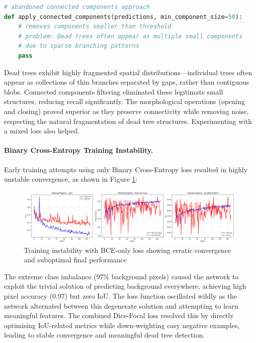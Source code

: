 \begin{lstlisting}[language=Python]
# abandoned connected components approach
def apply_connected_components(predictions, min_component_size=50):
    # removes components smaller than threshold
    # problem: Dead trees often appear as multiple small components
    # due to sparse branching patterns
    pass
\end{lstlisting}

Dead trees exhibit highly fragmented spatial distributions—individual trees often appear as collections of thin branches separated by gaps, rather than contiguous blobs. Connected components filtering eliminated these legitimate small structures, reducing recall significantly. The morphological operations (opening and closing) proved superior as they preserve connectivity while removing noise, respecting the natural fragmentation of dead tree structures. Experimenting with a mixed loss also helped.

\paragraph{Binary Cross-Entropy Training Instability.}
Early training attempts using only Binary Cross-Entropy loss resulted in highly unstable convergence, as shown in Figure \ref{fig:bad_training}:

\begin{figure}[h]
  \centering
  \includegraphics[width=0.9\linewidth]{figs/unet-bad-train.jpg}
  \caption{Training instability with BCE-only loss showing erratic convergence and suboptimal final performance}
  \label{fig:bad_training}
\end{figure}

The extreme class imbalance (97\% background pixels) caused the network to exploit the trivial solution of predicting background everywhere, achieving high pixel accuracy (0.97) but zero IoU. The loss function oscillated wildly as the network alternated between this degenerate solution and attempting to learn meaningful features. The combined Dice-Focal loss resolved this by directly optimising IoU-related metrics while down-weighting easy negative examples, leading to stable convergence and meaningful dead tree detection.


